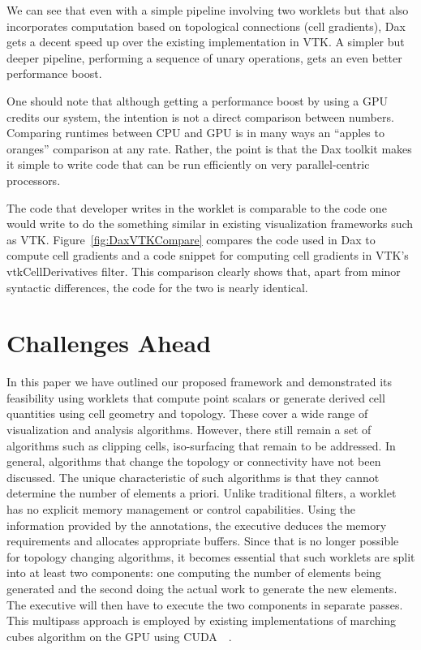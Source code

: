 \documentclass{vgtc}                          %
\newcommand*{\lcite}[1]{~\cite{#1}}
\begin{document}

We can see that even with a simple pipeline involving two worklets but that
also incorporates computation based on topological connections (cell
gradients), Dax gets a decent speed up over the existing implementation in
VTK.  A simpler but deeper pipeline, performing a sequence of unary
operations, gets an even better performance boost.

One should note that although getting a performance boost by using a GPU
credits our system,  the intention is not a direct comparison between
numbers.  Comparing runtimes between CPU and GPU is in many ways an
``apples to oranges'' comparison at any rate.  Rather, the point is that
the Dax toolkit makes it simple to write code that can be run efficiently
on very parallel-centric processors.

The code that developer writes in the worklet is comparable to the code
one would write to do the something similar in existing visualization frameworks
such as VTK. Figure~\ref{fig:DaxVTKCompare} compares the code used in Dax
to compute cell gradients and a code snippet for computing cell gradients
in VTK's vtkCellDerivatives filter.  This comparison clearly shows that,
apart from minor syntactic differences, the code for the two is nearly
identical.

\section{Challenges Ahead}
\label{sec:Challenges}

In this paper we have outlined our proposed framework and demonstrated its
feasibility using worklets that compute point scalars or generate derived cell
quantities using cell geometry and topology. These cover a wide range of
visualization and analysis algorithms. However, there still remain a set of
algorithms such as clipping cells, iso-surfacing that remain to be addressed. In
general, algorithms that change the topology or connectivity have not been
discussed. The unique characteristic of such algorithms is that they cannot
determine the number of elements a priori. Unlike traditional filters, a
worklet has no explicit memory management or control capabilities. Using the
information provided by the annotations, the executive deduces the memory
requirements and allocates appropriate buffers. Since that is no longer possible
for topology changing algorithms, it becomes essential that such worklets are
split into at least two components: one computing the number of elements being
generated and the second doing the actual work to generate the new elements. The
executive will then have to execute the two components in separate passes. This
multipass approach is employed by existing implementations of marching
cubes algorithm on the GPU using CUDA~\lcite{CudaMarchingCubes}.
\end{document}
